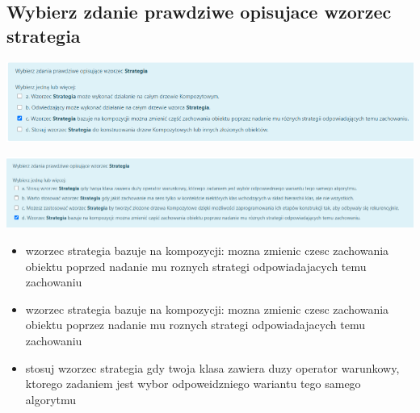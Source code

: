 \documentclass[11pt]{article}
\begin{document}
\subsection{Wybierz zdanie prawdziwe opisujace wzorzec strategia}
\label{sec:orgcc4a3df}
\begin{center}
\includegraphics[width=.9\linewidth]{./zadanie2.png}
\end{center}
\begin{center}
\includegraphics[width=.9\linewidth]{./zadanie10.png}
\end{center}
\begin{itemize}
\item wzorzec strategia bazuje na kompozycji: mozna zmienic czesc zachowania obiektu poprzed nadanie mu roznych strategi odpowiadajacych temu zachowaniu
\item wzorzec strategia bazuje na kompozycji: mozna zmienic czesc zachowania obiektu poprzez nadanie mu roznych strategi odpowiadajacych temu zachowaniu
\item stosuj wzorzec strategia gdy twoja klasa zawiera duzy operator warunkowy, ktorego zadaniem jest wybor odpoweidzniego wariantu tego samego algorytmu
\end{itemize}
\end{document}

